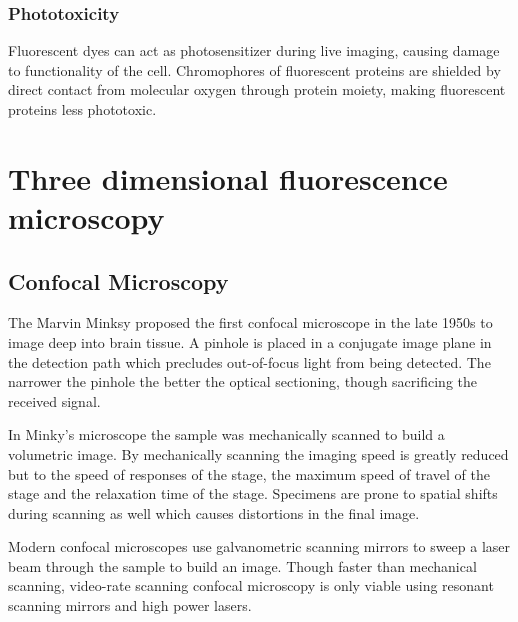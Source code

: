 

\subsubsection{Phototoxicity}

Fluorescent dyes can act as photosensitizer during live imaging, causing damage to functionality of the cell.
Chromophores of fluorescent proteins are shielded by direct contact from molecular oxygen through protein moiety, making fluorescent proteins less phototoxic.


\section{Three dimensional fluorescence microscopy}
\subsection{Confocal Microscopy}

The Marvin Minksy proposed the first confocal microscope in the late 1950s to image deep into brain tissue.
A pinhole is placed in a conjugate image plane in the detection path which precludes out-of-focus light from being detected.
The narrower the pinhole the better the optical sectioning, though sacrificing the received signal.

In Minky's microscope the sample was mechanically scanned to build a volumetric image.
By mechanically scanning the imaging speed is greatly reduced but to the speed of responses of the stage, the maximum speed of travel of the stage and the relaxation time of the stage.
Specimens are prone to spatial shifts during scanning as well which causes distortions in the final image.

Modern confocal microscopes use galvanometric scanning mirrors to sweep a laser beam through the sample to build an image.
Though faster than mechanical scanning, video-rate scanning confocal microscopy is only viable using resonant scanning mirrors and high power lasers.


